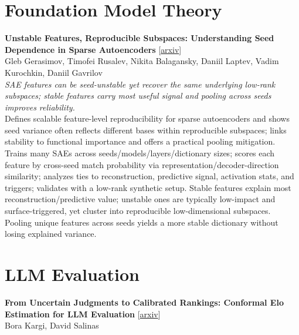 \documentclass[12pt,letterpaper]{article}
\begin{document}
\medskip


\section*{Foundation Model Theory}

{\small\textbf{Unstable Features, Reproducible Subspaces: Understanding Seed Dependence in Sparse Autoencoders}} {\scriptsize[\href{https://arxiv.org/abs/2606.12138}{arxiv}]}\\
{\scriptsize Gleb Gerasimov, Timofei Rusalev, Nikita Balagansky, Daniil Laptev, Vadim Kurochkin, Daniil Gavrilov}\\

{\small\textit{SAE features can be seed-unstable yet recover the same underlying low-rank subspaces; stable features carry most useful signal and pooling across seeds improves reliability.}}\\[1pt]
{\footnotesize Defines scalable feature-level reproducibility for sparse autoencoders and shows seed variance often reflects different bases within reproducible subspaces; links stability to functional importance and offers a practical pooling mitigation. Trains many SAEs across seeds/models/layers/dictionary sizes; scores each feature by cross-seed match probability via representation/decoder-direction similarity; analyzes ties to reconstruction, predictive signal, activation stats, and triggers; validates with a low-rank synthetic setup. Stable features explain most reconstruction/predictive value; unstable ones are typically low-impact and surface-triggered, yet cluster into reproducible low-dimensional subspaces. Pooling unique features across seeds yields a more stable dictionary without losing explained variance.}

\medskip


\section*{LLM Evaluation}

{\small\textbf{From Uncertain Judgments to Calibrated Rankings: Conformal Elo Estimation for LLM Evaluation}} {\scriptsize[\href{https://arxiv.org/abs/2606.13221}{arxiv}]}\\
{\scriptsize Bora Kargi, David Salinas}\\
\end{document}
